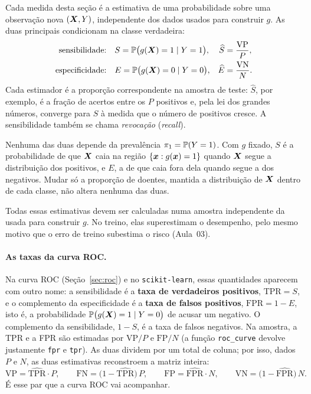 \documentclass[11pt,a4paper]{article}
\begin{document}
Cada medida desta seção é a estimativa de uma probabilidade sobre uma observação
nova $(\bm{X},Y)$, independente dos dados usados para construir $g$. As duas principais
condicionam na classe verdadeira:
\begin{align*}
  \text{sensibilidade:}\quad & S=\mathbb{P}\big(g(\bm{X})=1\mid Y=1\big),
    & \widehat S&=\frac{\text{VP}}{P},\\
  \text{especificidade:}\quad & E=\mathbb{P}\big(g(\bm{X})=0\mid Y=0\big),
    & \widehat E&=\frac{\text{VN}}{N}.
\end{align*}
Cada estimador é a proporção correspondente na amostra de teste: $\widehat S$, por
exemplo, é a fração de acertos entre os $P$ positivos e, pela lei dos grandes
números, converge para $S$ à medida que o número de positivos cresce. A sensibilidade
também se chama \emph{revocação} (\emph{recall}).

Nenhuma das duas depende da prevalência $\pi_1=\mathbb{P}(Y=1)$. Com $g$ fixado, $S$ é a
probabilidade de que $\bm{X}$ caia na região $\{\bm{x} : g(\bm{x})=1\}$ quando $\bm{X}$ segue a
distribuição dos positivos, e $E$, a de que caia fora dela quando segue a dos
negativos. Mudar só a proporção de doentes, mantida a distribuição de $\bm{X}$ dentro de
cada classe, não altera nenhuma das duas.

\begin{atencao}
Todas essas estimativas devem ser calculadas numa amostra independente da usada para
construir $g$. No treino, elas superestimam o desempenho, pelo mesmo motivo que o
erro de treino subestima o risco (Aula~03).
\end{atencao}

\paragraph{As taxas da curva ROC.} Na curva ROC (Seção~\ref{sec:roc}) e no
\texttt{scikit-learn}, essas quantidades aparecem com outro nome: a sensibilidade
é a \textbf{taxa de verdadeiros positivos}, $\text{TPR}=S$, e o complemento da
especificidade é a \textbf{taxa de falsos positivos}, $\text{FPR}=1-E$, isto é, a
probabilidade ${\mathbb{P}\big(g(\bm{X})=1\mid Y=0\big)}$ de acusar um negativo. O complemento
da sensibilidade, $1-S$, é a taxa de falsos negativos. Na amostra, a TPR e a FPR são
estimadas por $\text{VP}/P$ e $\text{FP}/N$ (a função
\texttt{roc\_curve} devolve justamente \texttt{fpr} e \texttt{tpr}). As duas dividem
por um total de coluna; por isso, dados $P$ e $N$, as duas estimativas reconstroem a
matriz inteira:
\[
  \text{VP}=\widehat{\text{TPR}}\cdot P,\qquad
  \text{FN}=\big(1-\widehat{\text{TPR}}\big)\,P,\qquad
  \text{FP}=\widehat{\text{FPR}}\cdot N,\qquad
  \text{VN}=\big(1-\widehat{\text{FPR}}\big)\,N .
\]
É esse par que a curva ROC vai acompanhar.
\end{document}
